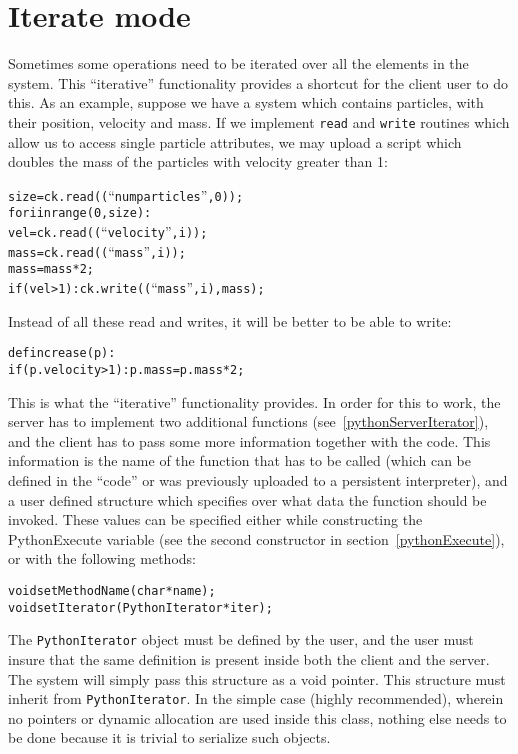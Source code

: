 \section{Iterate mode}
\label{pythonIterator}

Sometimes some operations need to be iterated over all the elements in the
system. This ``iterative'' functionality provides a shortcut for the client user
to do this. As an example, suppose we have a system which contains particles,
with their position, velocity and mass. If we implement \texttt{read} and
\texttt{write} routines which allow us to access single particle attributes, we may
upload a script which doubles the mass of the particles with velocity greater
than 1:

\begin{alltt}
size = ck.read((``numparticles'', 0));
for i in range(0, size):
    vel = ck.read((``velocity'', i));
    mass = ck.read((``mass'', i));
    mass = mass * 2;
    if (vel > 1): ck.write((``mass'', i), mass);
\end{alltt}

Instead of all these read and writes, it will be better to be able to write:

\begin{alltt}
def increase(p):
    if (p.velocity > 1): p.mass = p.mass * 2;
\end{alltt}

This is what the ``iterative'' functionality provides. In order for this to
work, the server has to implement two additional functions
(see~\ref{pythonServerIterator}), and the client has to pass some more
information together with the code. This information is the name of the function
that has to be called (which can be defined in the ``code'' or was previously
uploaded to a persistent interpreter), and a user defined structure which
specifies over what data the function should be invoked. These values can be
specified either while constructing the PythonExecute variable (see the second
constructor in section~\ref{pythonExecute}), or with the following methods:

\begin{alltt}
void setMethodName(char *name);
void setIterator(PythonIterator *iter);
\end{alltt}

The \texttt{PythonIterator} object must be defined by the user, and
the user must insure that the same definition is present inside both the
client and the server. The \charmpp{} system will simply pass this structure as
a void pointer. This structure must inherit from \texttt{PythonIterator}.  In the simple case (highly recommended), wherein no pointers or dynamic allocation are used inside this class,  nothing else needs to be done because it is trivial to serialize such objects.

